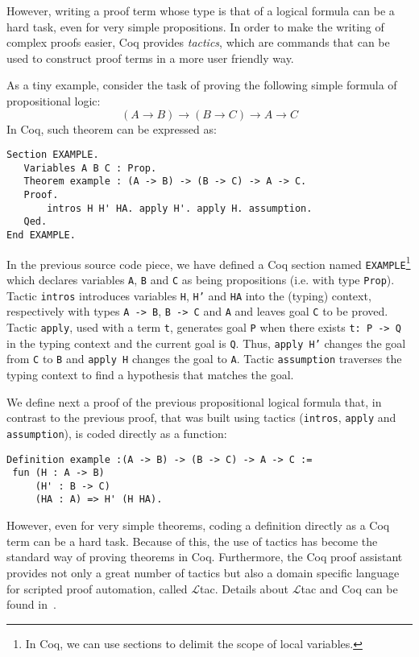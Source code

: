 \documentclass[sigconf,anonymous]{acmart}
\begin{document}
However, writing a proof term whose type is that of a logical formula
can be a hard task, even for very simple propositions.  In order to
make the writing of complex proofs easier, Coq provides
\emph{tactics}, which are commands that can be used to construct proof
terms in a more user friendly way.

As a tiny example, consider the task of proving the following simple
formula of propositional logic:
\[
(A \to B)\to (B\to C) \to A \to C
\]
In Coq, such theorem can be expressed as:
\begin{verbatim}
Section EXAMPLE.
   Variables A B C : Prop.
   Theorem example : (A -> B) -> (B -> C) -> A -> C.
   Proof.
       intros H H' HA. apply H'. apply H. assumption. 
   Qed.
End EXAMPLE.
\end{verbatim}
In the previous source code piece, we have defined a Coq section named
\texttt{EXAMPLE}\footnote{In Coq, we can use sections to delimit the
  scope of local variables.} which declares variables \texttt{A},
\texttt{B} and \texttt{C} as being propositions (i.e. with type
\texttt{Prop}). Tactic \texttt{intros} introduces variables
\texttt{H}, \texttt{H'} and \texttt{HA} into the (typing) context,
respectively with types \texttt{A -> B}, \texttt{B -> C} and
\texttt{A} and leaves goal \texttt{C} to be proved. Tactic
\texttt{apply}, used with a term \texttt{t}, generates goal
\texttt{P}
when there exists \texttt{t: P -> Q} in the typing context and the
current goal is \texttt{Q}. Thus, \texttt{apply H'} changes the goal
from \texttt{C} to \texttt{B} and \texttt{apply H}
changes the goal to \texttt{A}. Tactic \texttt{assumption}
traverses the typing context to find a hypothesis that matches the goal.

We define next a proof of the previous propositional logical formula
that, in contrast to the previous proof, that was built using tactics
(\texttt{intros}, \texttt{apply} and \texttt{assumption}), is coded
directly as a function:
\begin{verbatim}
Definition example :(A -> B) -> (B -> C) -> A -> C :=
 fun (H : A -> B)
     (H' : B -> C)
     (HA : A) => H' (H HA).
\end{verbatim}
However, even for very simple theorems, coding a definition directly
as a Coq term can be a hard task. Because of this, the use of tactics
has become the standard way of proving theorems in Coq. Furthermore,
the Coq proof assistant provides not only a great number of tactics
but also a domain specific language for scripted proof automation,
called $\mathcal{L}$tac. Details about $\mathcal{L}$tac and Coq can be found
in~\cite{Chlipala13,Bertot10,manual_coq}.
\end{document}
